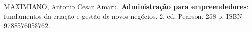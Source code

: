 \begin{pud}
\begin{bibcomplementar}
         \item MAXIMIANO, Antonio Cesar Amaru. \textbf{Administração para empreendedores}: fundamentos da criação e gestão de novos negócios. 2. ed. Pearson.  258 p. ISBN 9788576058762.   %

	\end{bibcomplementar}
	
		
\end{pud}





